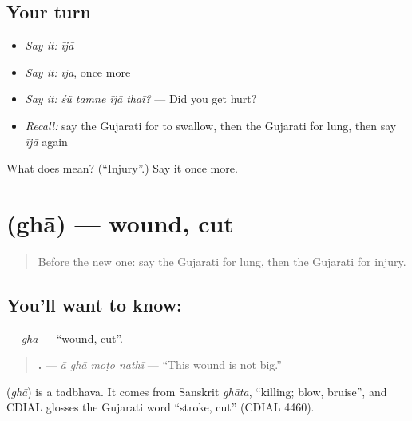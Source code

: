 \subsection*{Your turn}
\begin{itemize}
\raggedright
  \item \emph{Say it:} \emph{ījā}
  \item \emph{Say it:} \emph{ījā}, once more
  \item \emph{Say it:} \emph{śũ tamne ījā thaī?} — Did you get hurt?
  \item \emph{Recall:} say the Gujarati for to swallow, then the Gujarati for lung, then say \emph{ījā} again
\end{itemize}

\begin{tcolorbox}[breakable,colback=teal!4,colframe=teal!35!black,title={Before you move on}]
What does  mean? (\textquotedblleft{}Injury\textquotedblright{}.) Say it once more.
\end{tcolorbox}
\section[\texorpdfstring{\gu{ઘા} (ghā)}{ઘા (ghā)}]{ (ghā) — wound, cut}

\label{lesson:GU-C227-gha}



\begin{quote}
Before the new one: say the Gujarati for lung, then the Gujarati for injury.
\end{quote}

\subsection*{You'll want to know: }
\textbf{} — \emph{ghā} — \textquotedblleft{}wound, cut\textquotedblright{}.

\begin{quote}
\textbf{   .} — \emph{ā ghā moṭo nathī} — \textquotedblleft{}This wound is not big.\textquotedblright{}
\end{quote}

\begin{cousinweb}
\textbf{} (\emph{ghā}) is a tadbhava. It comes from Sanskrit \emph{ghāta}, \textquotedblleft{}killing; blow, bruise\textquotedblright{}, and CDIAL glosses the Gujarati word \textquotedblleft{}stroke, cut\textquotedblright{} (CDIAL 4460).
\end{cousinweb}

